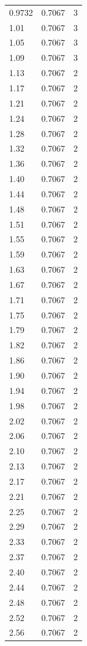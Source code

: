 \begin{longtable}{lrr}
  0.9732 & 0.7067 & 3 \\
  1.01 & 0.7067 & 3 \\
  1.05 & 0.7067 & 3 \\
  1.09 & 0.7067 & 3 \\
  1.13 & 0.7067 & 2 \\
  1.17 & 0.7067 & 2 \\
  1.21 & 0.7067 & 2 \\
  1.24 & 0.7067 & 2 \\
  1.28 & 0.7067 & 2 \\
  1.32 & 0.7067 & 2 \\
  1.36 & 0.7067 & 2 \\
  1.40 & 0.7067 & 2 \\
  1.44 & 0.7067 & 2 \\
  1.48 & 0.7067 & 2 \\
  1.51 & 0.7067 & 2 \\
  1.55 & 0.7067 & 2 \\
  1.59 & 0.7067 & 2 \\
  1.63 & 0.7067 & 2 \\
  1.67 & 0.7067 & 2 \\
  1.71 & 0.7067 & 2 \\
  1.75 & 0.7067 & 2 \\
  1.79 & 0.7067 & 2 \\
  1.82 & 0.7067 & 2 \\
  1.86 & 0.7067 & 2 \\
  1.90 & 0.7067 & 2 \\
  1.94 & 0.7067 & 2 \\
  1.98 & 0.7067 & 2 \\
  2.02 & 0.7067 & 2 \\
  2.06 & 0.7067 & 2 \\
  2.10 & 0.7067 & 2 \\
  2.13 & 0.7067 & 2 \\
  2.17 & 0.7067 & 2 \\
  2.21 & 0.7067 & 2 \\
  2.25 & 0.7067 & 2 \\
  2.29 & 0.7067 & 2 \\
  2.33 & 0.7067 & 2 \\
  2.37 & 0.7067 & 2 \\
  2.40 & 0.7067 & 2 \\
  2.44 & 0.7067 & 2 \\
  2.48 & 0.7067 & 2 \\
  2.52 & 0.7067 & 2 \\
  2.56 & 0.7067 & 2 \\

\end{longtable}
